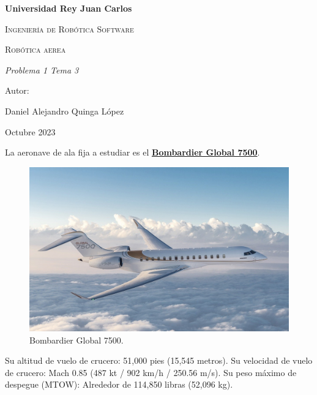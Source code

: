 \documentclass{article}
\begin{document}
    \begin{titlepage}
        \centering
        {\bfseries\LARGE Universidad Rey Juan Carlos\par}
        \vspace{1cm}
        {\scshape\Large Ingenier\'ia de Rob\'otica Software \par}
        \vspace{3cm}
        {\scshape\Huge Rob\'otica aerea \par}
        \vspace{3cm}
        {\itshape\Large Problema 1 Tema 3 \par}
        \vfill
        {\Large Autor: \par}
        {\Large Daniel Alejandro Quinga L\'opez \par}
        \vfill
        {\Large Octubre 2023 \par}
    \end{titlepage}

    \newpage
    
    La aeronave de ala fija a estudiar es el \href{https://en.wikipedia.org/wiki/Bombardier_Global_7500}{\textbf{Bombardier Global 7500}}.
    \begin{figure}[h]
        \centerline{\hspace{0cm}\includegraphics[width=0.66\columnwidth]{BombardierGlobal.jpg}}
        \caption{Bombardier Global 7500.}\label{fig:figura_1}
    \end{figure}


    Su altitud de vuelo de crucero: 51,000 pies (15,545 metros).
    \newline
    Su velocidad de vuelo de crucero: Mach 0.85 (487 kt / 902 km/h / 250.56 m/s).
    \newline
    Su peso máximo de despegue (MTOW): Alrededor de 114,850 libras (52,096 kg).
    \newline
\end{document}
